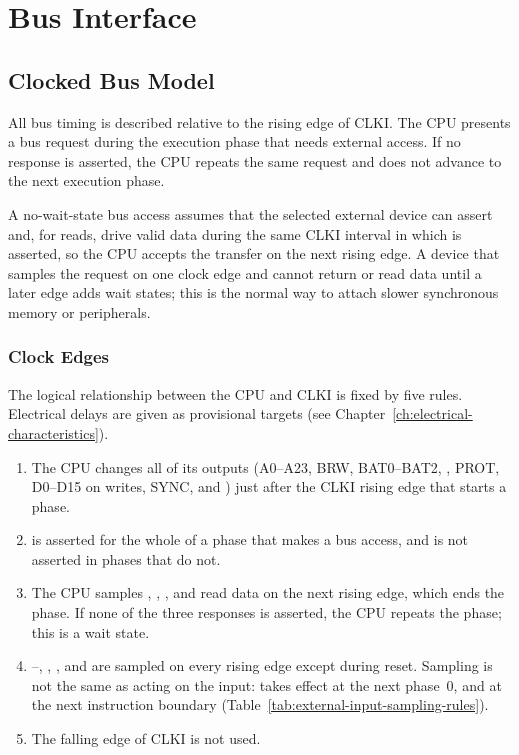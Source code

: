 \chapter{Bus Interface}
\label{ch:bus-interface}

\section{Clocked Bus Model}
\label{sec:clocked-bus-model}

All bus timing is described relative to the rising edge of CLKI. The CPU presents a bus request during the execution
phase that needs external access. If no response is asserted, the CPU repeats the same request and does not advance to
the next execution phase.

A no-wait-state bus access assumes that the selected external device can assert  and, for reads, drive
valid data during the same CLKI interval in which  is asserted, so the CPU accepts the transfer on the
next rising edge. A device that samples the request on one clock edge and cannot return  or read data
until a later edge adds wait states; this is the normal way to attach slower synchronous memory or peripherals.

\subsection{Clock Edges}
\label{sec:clock-edges}

The logical relationship between the CPU and CLKI is fixed by five rules. Electrical delays are given as provisional
targets (see Chapter~\ref{ch:electrical-characteristics}).

\begin{enumerate}
	\item The CPU changes all of its outputs (A0--A23, BRW, BAT0--BAT2, , PROT, D0--D15 on writes, SYNC, and
	      ) just after the CLKI rising edge that starts a phase.
	\item {} is asserted for the whole of a phase that makes a bus access, and is not asserted in phases that do
	      not.
	\item The CPU samples , , , and read data on the next rising edge, which ends
	      the phase. If none of the three responses is asserted, the CPU repeats the phase; this is a wait state.
	\item {}--, , , and  are sampled on every rising edge except during
	      reset. Sampling is not the same as acting on the input:  takes effect at the next phase~0, and
	       at the next instruction boundary (Table~\ref{tab:external-input-sampling-rules}).
	\item The falling edge of CLKI is not used.
\end{enumerate}

